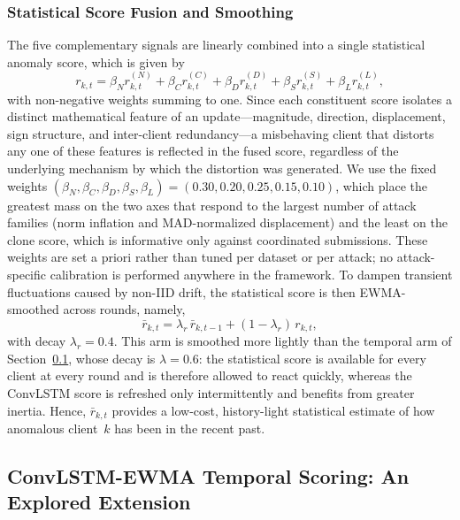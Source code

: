 \documentclass[journal]{IEEEtran}
\begin{document}
\subsubsection{Statistical Score Fusion and Smoothing}
The five complementary signals are linearly combined into a single statistical anomaly score, which is given by
\begin{equation}
r_{k,t} = \beta_N r_{k,t}^{(N)} + \beta_C r_{k,t}^{(C)} + \beta_D r_{k,t}^{(D)} + \beta_S r_{k,t}^{(S)} + \beta_L r_{k,t}^{(L)},
\label{eq:stat_score}
\end{equation}
with non-negative weights summing to one. Since each constituent score isolates a distinct mathematical feature of an update---magnitude, direction, displacement, sign structure, and inter-client redundancy---a misbehaving client that distorts any one of these features is reflected in the fused score, regardless of the underlying mechanism by which the distortion was generated. We use the fixed weights $(\beta_N, \beta_C, \beta_D, \beta_S, \beta_L) = (0.30, 0.20, 0.25, 0.15, 0.10)$, which place the greatest mass on the two axes that respond to the largest number of attack families (norm inflation and MAD-normalized displacement) and the least on the clone score, which is informative only against coordinated submissions. These weights are set a priori rather than tuned per dataset or per attack; no attack-specific calibration is performed anywhere in the framework. To dampen transient fluctuations caused by non-IID drift, the statistical score is then EWMA-smoothed across rounds, namely,
\begin{equation}
\bar r_{k,t} = \lambda_r\,\bar r_{k,t-1} + (1-\lambda_r)\,r_{k,t},
\label{eq:stat_ewma}
\end{equation}
with decay $\lambda_r = 0.4$. This arm is smoothed more lightly than the temporal arm of Section~\ref{sec:convlstm_ewma}, whose decay is $\lambda = 0.6$: the statistical score is available for every client at every round and is therefore allowed to react quickly, whereas the ConvLSTM score is refreshed only intermittently and benefits from greater inertia. Hence, $\bar r_{k,t}$ provides a low-cost, history-light statistical estimate of how anomalous client~$k$ has been in the recent past.

\subsection{ConvLSTM-EWMA Temporal Scoring: An Explored Extension}
\label{sec:convlstm_ewma}
\end{document}
